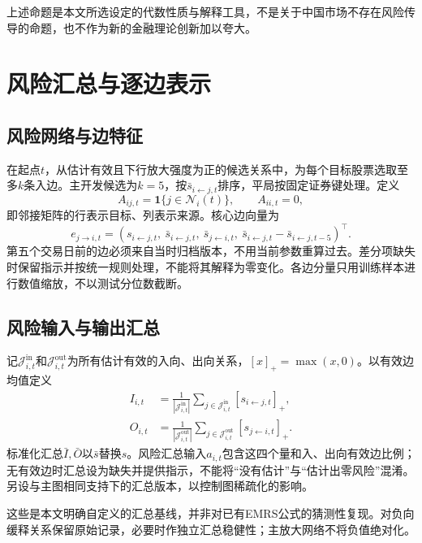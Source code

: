 上述命题是本文所选设定的代数性质与解释工具，不是关于中国市场不存在风险传导的命题，也不作为新的金融理论创新加以夸大。

\section{风险汇总与逐边表示}
\subsection{风险网络与边特征}
在起点$t$，从估计有效且下行放大强度为正的候选关系中，为每个目标股票选取至多$k$条入边。主开发候选为$k=5$，按$\bar s_{i\leftarrow j,t}$排序，平局按固定证券键处理。定义
\begin{equation}\label{eq:adjacency}
A_{ij,t}=\mathbf1\{j\in\mathcal N_i(t)\},\qquad A_{ii,t}=0,
\end{equation}
即邻接矩阵的行表示目标、列表示来源。核心边向量为
\begin{equation}\label{eq:edgefeatures}
e_{j\to i,t}=
\left(s_{i\leftarrow j,t},\ \bar s_{i\leftarrow j,t},\ \bar s_{j\leftarrow i,t},\
\bar s_{i\leftarrow j,t}-\bar s_{i\leftarrow j,t-5}\right)^{\!\top}.
\end{equation}
第五个交易日前的边必须来自当时归档版本，不用当前参数重算过去。差分项缺失时保留指示并按统一规则处理，不能将其解释为零变化。各边分量只用训练样本进行数值缩放，不以测试分位数截断。

\subsection{风险输入与输出汇总}
记$\mathcal J_{i,t}^{\mathrm{in}}$和$\mathcal J_{i,t}^{\mathrm{out}}$为所有估计有效的入向、出向关系，$[x]_+=\max(x,0)$。以有效边均值定义
\begin{align}
I_{i,t}&=\frac{1}{|\mathcal J_{i,t}^{\mathrm{in}}|}\sum_{j\in\mathcal J_{i,t}^{\mathrm{in}}}[s_{i\leftarrow j,t}]_+,\label{eq:inaggregate}\\
O_{i,t}&=\frac{1}{|\mathcal J_{i,t}^{\mathrm{out}}|}\sum_{j\in\mathcal J_{i,t}^{\mathrm{out}}}[s_{j\leftarrow i,t}]_+.\label{eq:outaggregate}
\end{align}
标准化汇总$\bar I,\bar O$以$\bar s$替换$s$。风险汇总输入$a_{i,t}$包含这四个量和入、出向有效边比例；无有效边时汇总设为缺失并提供指示，不能将“没有估计”与“估计出零风险”混淆。另设与主图相同支持下的汇总版本，以控制图稀疏化的影响。

这些是本文明确自定义的汇总基线，并非对已有EMRS公式的猜测性复现。对负向缓释关系保留原始记录，必要时作独立汇总稳健性；主放大网络不将负值绝对化。

